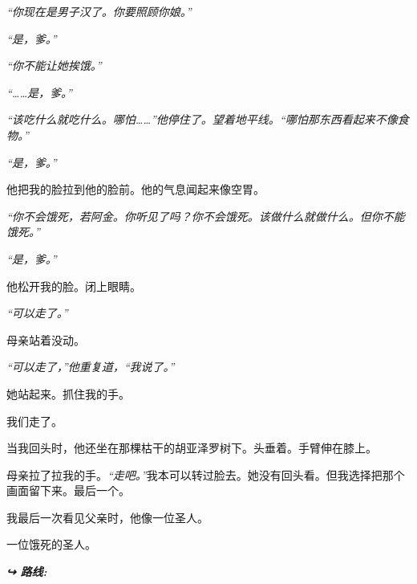 \noindent \textit{“你现在是男子汉了。你要照顾你娘。”}

\noindent \textit{“是，爹。”}

\noindent \textit{“你不能让她挨饿。”}

\noindent \textit{“……是，爹。”}

\noindent \textit{“该吃什么就吃什么。哪怕……”他停住了。望着地平线。“哪怕那东西看起来不像食物。”}

\noindent \textit{“是，爹。”}

\noindent 他把我的脸拉到他的脸前。他的气息闻起来像空胃。

\noindent \textit{“你不会饿死，若阿金。你听见了吗？你不会饿死。该做什么就做什么。但你不能饿死。”}

\noindent \textit{“是，爹。”}

\noindent 他松开我的脸。闭上眼睛。

\noindent \textit{“可以走了。”}

\noindent 母亲站着没动。

\noindent \textit{“可以走了，”他重复道，“我说了。”}

\noindent 她站起来。抓住我的手。

\noindent 我们走了。

\noindent 当我回头时，他还坐在那棵枯干的胡亚泽罗树下。头垂着。手臂伸在膝上。

\noindent 母亲拉了拉我的手。\textit{“走吧。”}我本可以转过脸去。她没有回头看。但我选择把那个画面留下来。最后一个。

\noindent 我最后一次看见父亲时，他像一位圣人。

\noindent 一位饿死的圣人。

\vspace{0.5em}
\noindent\textit{\textbf{↪ 路线:}  \rotasep {} \rotasep {}}
